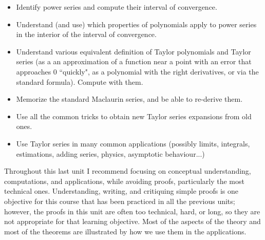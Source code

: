 \documentclass[11pt]{article}
\begin{document}
	\begin{itemize}
		\item Identify power series and compute their interval of convergence. %

		\item Understand (and use) which properties of polynomials apply to power series
			in the interior of the interval of convergence.

		\item Understand various equivalent definition of Taylor polynomials and Taylor
			series (as a an approximation of a function near a point with an error
			that approaches 0 ``quickly", as a polynomial with the right derivatives, or
			via the standard formula). Compute with them.

		\item Memorize the standard Maclaurin series, and be able to re-derive them.

		\item Use all the common tricks to obtain new Taylor series expansions from old
			ones.

		\item Use Taylor series in many common applications (possibly limits, integrals,
			estimations, adding series, physics, asymptotic behaviour...)
	\end{itemize}

	Throughout this last unit I recommend focusing on conceptual understanding,
	computations, and applications, while avoiding proofs, particularly the most technical
	ones. Understanding, writing, and critiquing simple proofs is one objective
	for this course that has been practiced in all the previous units; however,
	the proofs in this unit are often too technical, hard, or long, so they are not
	appropriate for that learning objective. Most of the aspects of the theory and
	most of the theorems are illustrated by how we use them in the applications.
\end{document}
